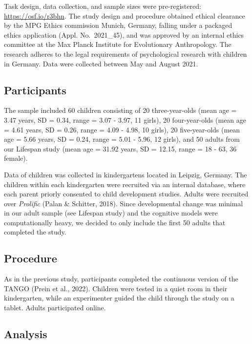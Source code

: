 \documentclass[
  man,floatsintext]{apa6}
\begin{document}
Task design, data collection, and sample sizes were pre-registered: \url{https://osf.io/r3bhn}.
The study design and procedure obtained ethical clearance by the MPG Ethics commission Munich, Germany, falling under a packaged ethics application (Appl. No.~2021\_45), and was approved by an internal ethics committee at the Max Planck Institute for Evolutionary Anthropology.
The research adheres to the legal requirements of psychological research with children in Germany.
Data were collected between May and August 2021.

\hypertarget{participants-1}{%
\subsection{Participants}\label{participants-1}}

The sample included 60 children consisting of 20 three-year-olds (mean age = 3.47 years, SD = 0.34, range = 3.07 - 3.97, 11 girls), 20 four-year-olds (mean age = 4.61 years, SD = 0.26, range = 4.09 - 4.98, 10 girls), 20 five-year-olds (mean age = 5.66 years, SD = 0.24, range = 5.01 - 5.96, 12 girls), and 50 adults from our Lifespan study (mean age = 31.92 years, SD = 12.15, range = 18 - 63, 36 female).

Data of children was collected in kindergartens located in Leipzig, Germany.
The children within each kindergarten were recruited via an internal database, where each parent priorly consented to child development studies.
Adults were recruited over \emph{Prolific} (Palan \& Schitter, 2018).
Since developmental change was minimal in our adult sample (see Lifespan study) and the cognitive models were computationally heavy, we decided to only include the first 50 adults that completed the study.

\hypertarget{procedure-1}{%
\subsection{Procedure}\label{procedure-1}}

As in the previous study, participants completed the continuous version of the TANGO (Prein et al., 2022).
Children were tested in a quiet room in their kindergarten, while an experimenter guided the child through the study on a tablet.
Adults participated online.

\hypertarget{analysis-1}{%
\subsection{Analysis}\label{analysis-1}}
\end{document}
